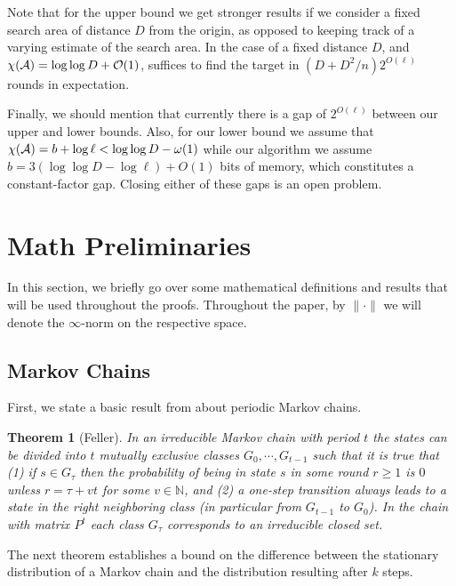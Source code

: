 \documentclass[11pt]{article}
\newtheorem{theorem}{Theorem}[section]
\newcommand{\BO}{\mathcal{O}}
\begin{document}
Note that for the upper bound we get stronger results if we consider a fixed search area of distance $D$ from the origin, as opposed to keeping track of a varying estimate of the search area. In the case of a fixed distance $D$, and $\chi({\cal A}) = \log \log D + \BO(1)$, suffices to find the target in $(D+D^2/n) 2^{O(\ell)}$ rounds in expectation.

Finally, we should mention that currently there is a gap of $2^{O(\ell)}$ between our upper and lower bounds. Also, for our lower bound we assume that $\chi({\cal A}) = b + \log \ell < \log \log D - \omega(1)$ while our algorithm we assume $b = 3(\log \log D -\log \ell) + O(1)$ bits of memory, which constitutes a constant-factor gap. Closing either of these gaps is an open problem.





\appendix

\section{Math Preliminaries}
\label{sec:math}

In this section, we briefly go over some mathematical definitions and results that will be used throughout the proofs. Throughout the paper, by $\|\cdot\|$ we will denote the $\infty$-norm on the respective space.

\subsection{Markov Chains}

First, we state a basic result from \cite{feller68} about periodic Markov chains.

\begin{theorem}[Feller]
\label{thm:feller}
	In an irreducible Markov chain with period $t$ the states can be divided into $t$ mutually exclusive classes $G_0, \cdots, G_{t-1}$ such that it is true that (1) if $s \in G_{\tau}$ then the probability of being in state $s$ in some round $r \geq 1$ is $0$ unless $r = \tau + vt$ for some $v \in \mathbb{N}$, and (2) a one-step transition always leads to a state in the right neighboring class (in particular from $G_{t-1}$ to $G_0$). In the chain with matrix $P^t$ each class $G_{\tau}$ corresponds to an irreducible closed set.
\end{theorem}

The next theorem establishes a bound on the difference between the stationary distribution of a Markov chain and the distribution resulting after $k$ steps.
\end{document}
